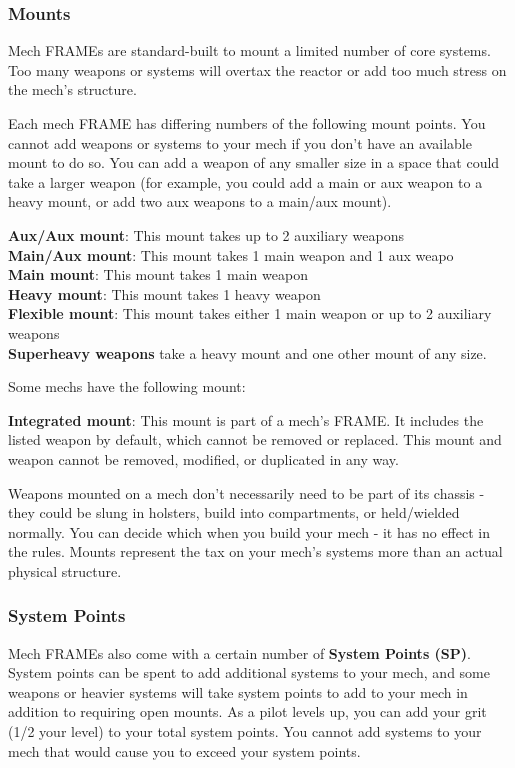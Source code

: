 \subsubsection{Mounts}

Mech FRAMEs are standard-built to mount a limited number of core systems. Too many weapons or systems will overtax the reactor or add too much stress on the mech’s structure. 

Each mech FRAME has differing numbers of the following mount points. You cannot add weapons or systems to your mech if you don’t have an available mount to do so. You can add a weapon of any smaller size in a space that could take a larger weapon (for example, you could add a main or aux weapon to a heavy mount, or add two aux weapons to a main/aux mount).

\textbf{Aux/Aux mount}: This mount takes up to 2 auxiliary weapons\\ 
\textbf{Main/Aux mount}: This mount takes 1 main weapon and 1 aux weapo\\
\textbf{Main mount}: This mount takes 1 main weapon\\
\textbf{Heavy mount}:  This mount takes 1 heavy weapon\\
\textbf{Flexible mount}: This mount takes either 1 main weapon or up to 2 auxiliary weapons\\

\textbf{Superheavy weapons} take a heavy mount and one other mount of any size.

Some mechs have the following mount:

\textbf{Integrated mount}: This mount is part of a mech’s FRAME. It includes the listed weapon by default, which cannot be removed or replaced. This mount and weapon cannot be removed, modified, or duplicated in any way. 

Weapons mounted on a mech don’t necessarily need to be part of its chassis - they could be slung in holsters, build into compartments, or held/wielded normally. You can decide which when you build your mech - it has no effect in the rules. Mounts represent the tax on your mech’s systems more than an actual physical structure.


\subsubsection{System Points}

Mech FRAMEs also come with a certain number of \textbf{System Points (SP)}. System points can be spent to add additional systems to your mech, and some weapons or heavier systems will take system points to add to your mech in addition to requiring open mounts. As a pilot levels up, you can add your grit (1/2 your level) to your total system points. You cannot add systems to your mech that would cause you to exceed your system points.

